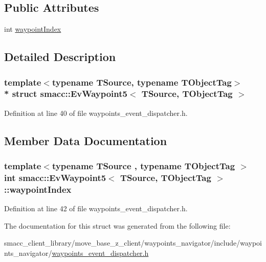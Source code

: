\subsection*{Public Attributes}
\begin{DoxyCompactItemize}
\item 
int \hyperlink{structsmacc_1_1EvWaypoint5_a15801444c08e14d335a9b00289961399}{waypoint\+Index}
\end{DoxyCompactItemize}


\subsection{Detailed Description}
\subsubsection*{template$<$typename T\+Source, typename T\+Object\+Tag$>$\\*
struct smacc\+::\+Ev\+Waypoint5$<$ T\+Source, T\+Object\+Tag $>$}



Definition at line 40 of file waypoints\+\_\+event\+\_\+dispatcher.\+h.



\subsection{Member Data Documentation}
\subsubsection[{\texorpdfstring{waypoint\+Index}{waypointIndex}}]{\setlength{\rightskip}{0pt plus 5cm}template$<$typename T\+Source , typename T\+Object\+Tag $>$ int {\bf smacc\+::\+Ev\+Waypoint5}$<$ T\+Source, T\+Object\+Tag $>$\+::waypoint\+Index}\hypertarget{structsmacc_1_1EvWaypoint5_a15801444c08e14d335a9b00289961399}{}\label{structsmacc_1_1EvWaypoint5_a15801444c08e14d335a9b00289961399}


Definition at line 42 of file waypoints\+\_\+event\+\_\+dispatcher.\+h.



The documentation for this struct was generated from the following file\+:\begin{DoxyCompactItemize}
\item 
smacc\+\_\+client\+\_\+library/move\+\_\+base\+\_\+z\+\_\+client/waypoints\+\_\+navigator/include/waypoints\+\_\+navigator/\hyperlink{waypoints__event__dispatcher_8h}{waypoints\+\_\+event\+\_\+dispatcher.\+h}\end{DoxyCompactItemize}
